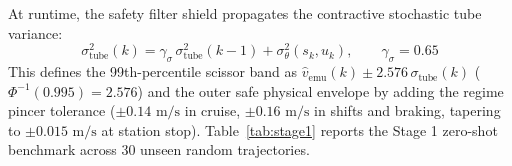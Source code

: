 \documentclass[10pt,a4paper]{article}
\begin{document}
At runtime, the safety filter shield \cite{banerjee2024,goodall2026,hsu2024} propagates the contractive stochastic tube variance:
\begin{equation}
    \sigma_{\text{tube}}^2(k) = \gamma_\sigma\, \sigma_{\text{tube}}^2(k - 1) + \sigma_\theta^2(s_k, u_k), \qquad \gamma_\sigma = 0.65
    \label{eq:tube_var}
\end{equation}
This defines the 99th-percentile scissor band as $\hat{v}_{\text{emu}}(k) \pm 2.576\,\sigma_{\text{tube}}(k)$ ($\Phi^{-1}(0.995) = 2.576$) and the outer safe physical envelope by adding the regime pincer tolerance ($\pm 0.14\text{ m/s}$ in cruise, $\pm 0.16\text{ m/s}$ in shifts and braking, tapering to $\pm 0.015\text{ m/s}$ at station stop). Table~\ref{tab:stage1} reports the Stage 1 zero-shot benchmark across 30 unseen random trajectories.
\end{document}
